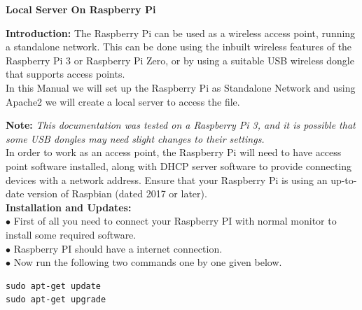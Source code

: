 \documentclass[journal,12pt,onecolumn]{IEEEtran}
\begin{document}
\centering \textbf{Local Server On Raspberry Pi}\\
\begin{flushleft}
\textbf{Introduction:}  The Raspberry Pi can be used as a wireless access point, running a standalone network. This can be done using the inbuilt wireless features of the Raspberry Pi 3 or Raspberry Pi Zero, or by using a suitable USB wireless dongle that supports access points.\\
\medskip
In this Manual we will set up the Raspberry Pi as Standalone Network and using Apache2 we will create a local server to access the file.\\
\medskip

\textbf{Note:} \textit{This documentation was tested on a Raspberry Pi 3, and it is possible that some USB dongles may need slight changes to their settings.}\\
\medskip
In order to work as an access point, the Raspberry Pi will need to have access point software installed, along with DHCP server software to provide connecting devices with a network address. Ensure that your Raspberry Pi is using an up-to-date version of Raspbian (dated 2017 or later).\\ 
\bigskip
\textbf{Installation and Updates:}\\
\bigskip
$\bullet$  First of all you need to connect your Raspberry PI with normal monitor to install some required software.\\
\bigskip
$\bullet$  Raspberry PI should have a internet connection.\\
\bigskip
$\bullet$  Now run the following two commands one by one given below. \\ 
\bigskip
\begin{lstlisting}[frame=single,linewidth=7cm,breaklines=true]
sudo apt-get update
sudo apt-get upgrade

\end{lstlisting}
\bigskip


\end{flushleft}
\end{document}
